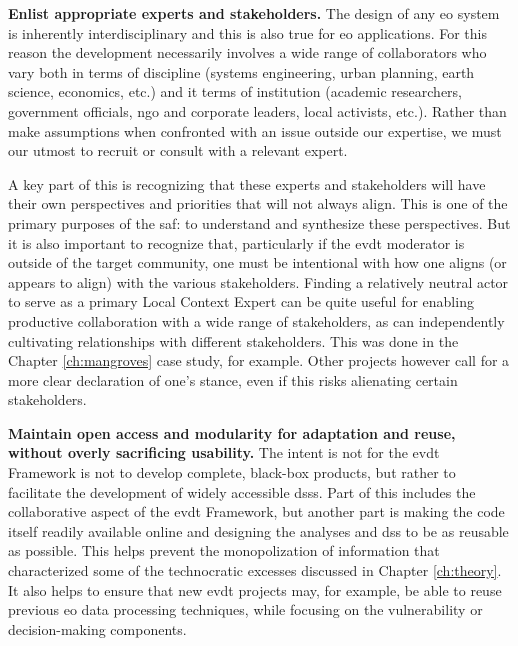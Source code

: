 \textbf{Enlist appropriate experts and stakeholders.} The design of any \ac{eo} system is inherently interdisciplinary and this is also true for \ac{eo} applications. For this reason the development necessarily involves a wide range of collaborators who vary both in terms of discipline (systems engineering, urban planning, earth science, economics, etc.) and it terms of institution (academic researchers, government officials, \ac{ngo} and corporate leaders, local activists, etc.). Rather than make assumptions when confronted with an issue outside our expertise, we must our utmost to recruit or consult with a relevant expert. 

A key part of this is recognizing that these experts and stakeholders will have their own perspectives and priorities that will not always align. This is one of the primary purposes of the \ac{saf}: to understand and synthesize these perspectives. But it is also important to recognize that, particularly if the \ac{evdt} moderator is outside of the target community, one must be intentional with how one aligns (or appears to align) with the various stakeholders. Finding a relatively neutral actor to serve as a primary Local Context Expert can be quite useful for enabling productive collaboration with a wide range of stakeholders, as can independently cultivating relationships with different stakeholders. This was done in the Chapter \ref{ch:mangroves} case study, for example. Other projects however call for a more clear declaration of one's stance, even if this risks alienating certain stakeholders.

\textbf{Maintain open access and modularity for adaptation and reuse, without overly sacrificing usability.} The intent is not for the \ac{evdt} Framework is not to develop complete, black-box products, but rather to facilitate the development of widely accessible \acp{dss}. Part of this includes the collaborative aspect of the \ac{evdt} Framework, but another part is making the code itself readily available online and designing the analyses and \ac{dss} to be as reusable as possible. This helps prevent the monopolization of information that characterized some of the technocratic excesses discussed in Chapter \ref{ch:theory}. It also helps to ensure that new \ac{evdt} projects may, for example, be able to reuse previous \ac{eo} data processing techniques, while focusing on the vulnerability or decision-making components.


